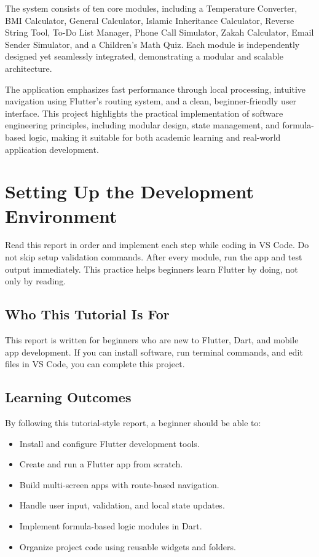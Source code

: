 \documentclass{article}
\begin{document}
\begin{insightbox}
The system consists of ten core modules, including a Temperature Converter, BMI Calculator, General Calculator, Islamic Inheritance Calculator, Reverse String Tool, To-Do List Manager, Phone Call Simulator, Zakah Calculator, Email Sender Simulator, and a Children’s Math Quiz. Each module is independently designed yet seamlessly integrated, demonstrating a modular and scalable architecture.

\medskip
The application emphasizes fast performance through local processing, intuitive navigation using Flutter’s routing system, and a clean, beginner-friendly user interface. This project highlights the practical implementation of software engineering principles, including modular design, state management, and formula-based logic, making it suitable for both academic learning and real-world application development.
\end{insightbox}

\newpage
\section{Setting Up the Development Environment}

\begin{insightbox}
Read this report in order and implement each step while coding in VS Code. Do not skip setup validation commands. After every module, run the app and test output immediately. This practice helps beginners learn Flutter by doing, not only by reading.
\end{insightbox}

\subsection{Who This Tutorial Is For}
This report is written for beginners who are new to Flutter, Dart, and mobile app development. If you can install software, run terminal commands, and edit files in VS Code, you can complete this project.

\subsection{Learning Outcomes}
By following this tutorial-style report, a beginner should be able to:
\begin{itemize}
\item Install and configure Flutter development tools.
\item Create and run a Flutter app from scratch.
\item Build multi-screen apps with route-based navigation.
\item Handle user input, validation, and local state updates.
\item Implement formula-based logic modules in Dart.
\item Organize project code using reusable widgets and folders.
\end{itemize}
\end{document}
